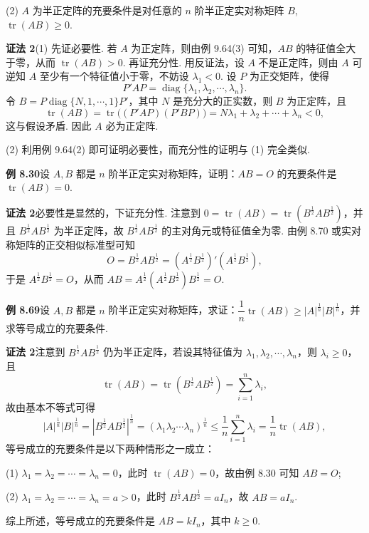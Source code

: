 \documentclass[UTF8,12pt,a4paper,fontset=fandol]{ctexart}
\begin{document}
(2) $A$ 为半正定阵的充要条件是对任意的 $n$ 阶半正定实对称矩阵 $B$, $\operatorname{tr}(AB)\ge0$.

\noindent\textbf{证法 2}\quad (1) 先证必要性. 若 $A$ 为正定阵，则由例 9.64(3) 可知，$AB$ 的特征值全大于零，从而 $\operatorname{tr}(AB)>0$. 再证充分性. 用反证法，设 $A$ 不是正定阵，则由 $A$ 可逆知 $A$ 至少有一个特征值小于零，不妨设 $\lambda_1<0$. 设 $P$ 为正交矩阵，使得
\[
P'AP=\operatorname{diag}\{\lambda_1,\lambda_2,\cdots,\lambda_n\}.
\]
令 $B=P\operatorname{diag}\{N,1,\cdots,1\}P'$，其中 $N$ 是充分大的正实数，则 $B$ 为正定阵，且
\[
\operatorname{tr}(AB)=\operatorname{tr}\bigl((P'AP)(P'BP)\bigr)=N\lambda_1+\lambda_2+\cdots+\lambda_n<0,
\]
这与假设矛盾. 因此 $A$ 必为正定阵.

(2) 利用例 9.64(2) 即可证明必要性，而充分性的证明与 (1) 完全类似.

\noindent\textbf{例 8.30}\quad 设 $A,B$ 都是 $n$ 阶半正定实对称矩阵，证明：$AB=O$ 的充要条件是 $\operatorname{tr}(AB)=0$.

\noindent\textbf{证法 2}\quad 必要性是显然的，下证充分性. 注意到 $0=\operatorname{tr}(AB)=\operatorname{tr}(B^{\frac12}AB^{\frac12})$，并且 $B^{\frac12}AB^{\frac12}$ 为半正定阵，故 $B^{\frac12}AB^{\frac12}$ 的主对角元或特征值全为零. 由例 8.70 或实对称矩阵的正交相似标准型可知
\[
O=B^{\frac12}AB^{\frac12}=(A^{\frac12}B^{\frac12})'(A^{\frac12}B^{\frac12}),
\]
于是 $A^{\frac12}B^{\frac12}=O$，从而 $AB=A^{\frac12}(A^{\frac12}B^{\frac12})B^{\frac12}=O$.

\noindent\textbf{例 8.69}\quad 设 $A,B$ 都是 $n$ 阶半正定实对称矩阵，求证：$\dfrac1n\operatorname{tr}(AB)\ge |A|^{\frac1n}|B|^{\frac1n}$，并求等号成立的充要条件.

\noindent\textbf{证法 2}\quad 注意到 $B^{\frac12}AB^{\frac12}$ 仍为半正定阵，若设其特征值为 $\lambda_1,\lambda_2,\cdots,\lambda_n$，则 $\lambda_i\ge0$，且
\[
\operatorname{tr}(AB)=\operatorname{tr}(B^{\frac12}AB^{\frac12})=\sum_{i=1}^n\lambda_i,
\]
故由基本不等式可得
\[
|A|^{\frac1n}|B|^{\frac1n}=|B^{\frac12}AB^{\frac12}|^{\frac1n}
=(\lambda_1\lambda_2\cdots\lambda_n)^{\frac1n}
\le \frac1n\sum_{i=1}^n\lambda_i=\frac1n\operatorname{tr}(AB),
\]
等号成立的充要条件是以下两种情形之一成立：

(1) $\lambda_1=\lambda_2=\cdots=\lambda_n=0$，此时 $\operatorname{tr}(AB)=0$，故由例 8.30 可知 $AB=O$;

(2) $\lambda_1=\lambda_2=\cdots=\lambda_n=a>0$，此时 $B^{\frac12}AB^{\frac12}=aI_n$，故 $AB=aI_n$.

综上所述，等号成立的充要条件是 $AB=kI_n$，其中 $k\ge0$.
\end{document}
